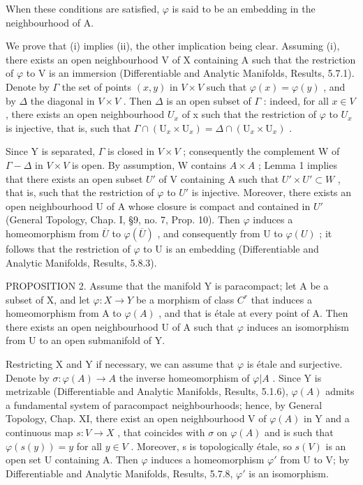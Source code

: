 When these conditions are satisfied, \(\varphi\) is said to be an embedding in the neighbourhood of A.

We prove that (i) implies (ii), the other implication being clear. Assuming (i), there exists an open neighbourhood V of X containing A such that the restriction of \(\varphi\) to V is an immersion (Differentiable and Analytic Manifolds, Results, 5.7.1). Denote by \(\Gamma\) the set of points \((x,y)\) in \(V \times V\) such that \(\varphi(x) = \varphi(y)\) , and by \(\Delta\) the diagonal in \(V \times V\) . Then \(\Delta\) is an open subset of \(\Gamma\) : indeed, for all \(x \in V\) , there exists an open neighbourhood \(U_x\) of x such that the restriction of \(\varphi\) to \(U_x\) is injective, that is, such that \(\Gamma \cap (\mathrm{U}_x \times \mathrm{U}_x) = \Delta \cap (\mathrm{U}_x \times \mathrm{U}_x)\) .

Since Y is separated, \(\varGamma\) is closed in \(V \times V\) ; consequently the complement W of \(\varGamma - \varDelta\) in \(V \times V\) is open. By assumption, W contains \(A \times A\) ; Lemma 1 implies that there exists an open subset \(U'\) of V containing A such that \(U' \times U' \subset W\) , that is, such that the restriction of \(\varphi\) to \(U'\) is injective. Moreover, there exists an open neighbourhood U of A whose closure is compact and contained in \(U'\) (General Topology, Chap. I, §9, no. 7, Prop. 10). Then \(\varphi\) induces a homeomorphism from \(\overline{U}\) to \(\varphi(\overline{U})\) , and consequently from U to \(\varphi(U)\) ; it follows that the restriction of \(\varphi\) to U is an embedding (Differentiable and Analytic Manifolds, Results, 5.8.3).

PROPOSITION 2. Assume that the manifold Y is paracompact; let A be a subset of X, and let \(\varphi : X \to Y\) be a morphism of class \(C^r\) that induces a homeomorphism from A to \(\varphi(A)\) , and that is étale at every point of A. Then there exists an open neighbourhood U of A such that \(\varphi\) induces an isomorphism from U to an open submanifold of Y.

Restricting X and Y if necessary, we can assume that \(\varphi\) is étale and surjective. Denote by \(\sigma : \varphi(A) \to A\) the inverse homeomorphism of \(\varphi|A\) . Since Y is metrizable (Differentiable and Analytic Manifolds, Results, 5.1.6), \(\varphi(A)\) admits a fundamental system of paracompact neighbourhoods; hence, by General Topology, Chap. XI, there exist an open neighbourhood V of \(\varphi(A)\) in Y and a continuous map \(s : V \to X\) , that coincides with \(\sigma\) on \(\varphi(A)\) and is such that \(\varphi(s(y)) = y\) for all \(y \in V\) . Moreover, s is topologically étale, so \(s(V)\) is an open set U containing A. Then \(\varphi\) induces a homeomorphism \(\varphi'\) from U to V; by Differentiable and Analytic Manifolds, Results, 5.7.8, \(\varphi'\) is an isomorphism.

